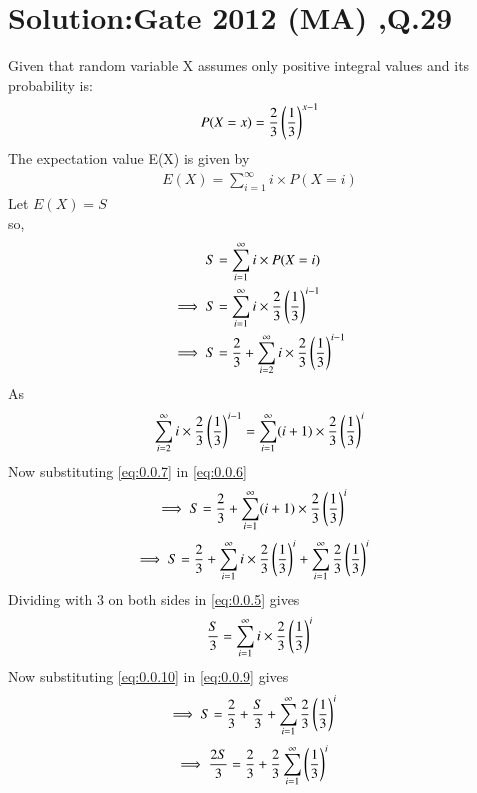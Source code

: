 \documentclass[journal,12pt,twocolumn]{IEEEtran}
\begin{document}
\section*{Solution:Gate 2012 (MA) ,Q.29}
  Given that random variable X  assumes only positive integral values and its probability is:
  \begin{align}
      P(X=x)=\frac{2}{3}\left(\frac{1}{3}\right)^{x-1}
  \end{align}
  The expectation value E(X) is given by 
  \begin{align}
      E(X)=\sum_{i=1}^{\infty} i \times P(X=i)
  \end{align}
  Let $E(X)=S$\\
  so,
  \begin{align}
      S&=\sum_{i=1}^{\infty} i \times P(X=i)\\
    \implies S&=\sum_{i=1}^{\infty} i \times
      \frac{2}{3}\left(\frac{1}{3}\right)^{i-1}\label{eq:0.0.5}\\
     \implies S&=\frac{2}{3}+\sum_{i=2}^{\infty} i \times
      \frac{2}{3}\left(\frac{1}{3}\right)^{i-1}\label{eq:0.0.6}
  \end{align}
  As
  \begin{align}
      \sum_{i=2}^{\infty} i \times
      \frac{2}{3}\left(\frac{1}{3}\right)^{i-1}=\sum_{i=1}^{\infty} (i+1)\times
      \frac{2}{3}\left(\frac{1}{3}\right)^{i}\label{eq:0.0.7}
  \end{align}
  Now substituting  \eqref{eq:0.0.7} in \eqref{eq:0.0.6}
  \begin{align}
      \implies S&=\frac{2}{3}+\sum_{i=1}^{\infty} (i+1) \times
      \frac{2}{3}\left(\frac{1}{3}\right)^{i}
  \end{align}
  \begin{align}
       \implies S&=\frac{2}{3}+\sum_{i=1}^{\infty} i \times
      \frac{2}{3}\left(\frac{1}{3}\right)^{i}+\sum_{i=1}^{\infty} 
      \frac{2}{3}\left(\frac{1}{3}\right)^{i}\label{eq:0.0.9}
  \end{align}
   Dividing with 3 on both sides in \eqref{eq:0.0.5} gives
   \begin{align}
      \frac{S}{3}=\sum_{i=1}^{\infty} i \times
      \frac{2}{3}\left(\frac{1}{3}\right)^{i}\label{eq:0.0.10}
  \end{align}
  Now substituting \eqref{eq:0.0.10} in \eqref{eq:0.0.9} gives
  \begin{align}
     \implies S&=\frac{2}{3}+\frac{S}{3}+\sum_{i=1}^{\infty}\frac{2}{3}\left(\frac{1}{3}\right)^{i}
     \end{align}
     \begin{align}
     \implies \frac{2S}{3}&=\frac{2}{3}+\frac{2}{3}\sum_{i=1}^{\infty}\left(\frac{1}{3}\right)^{i}
  \end{align}
\end{document}
